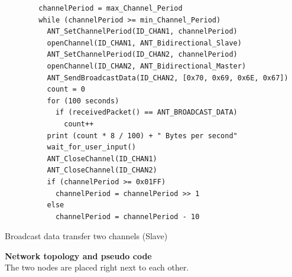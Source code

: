 \begin{description}
	\begin{code}[H]
		\begin{verbatim}
		channelPeriod = max_Channel_Period
		while (channelPeriod >= min_Channel_Period)
		  ANT_SetChannelPeriod(ID_CHAN1, channelPeriod)
		  openChannel(ID_CHAN1, ANT_Bidirectional_Slave)
		  ANT_SetChannelPeriod(ID_CHAN2, channelPeriod)
		  openChannel(ID_CHAN2, ANT_Bidirectional_Master)
		  ANT_SendBroadcastData(ID_CHAN2, [0x70, 0x69, 0x6E, 0x67])
		  count = 0
		  for (100 seconds) 
		    if (receivedPacket() == ANT_BROADCAST_DATA)
		      count++			
		  print (count * 8 / 100) + " Bytes per second"
		  wait_for_user_input()
		  ANT_CloseChannel(ID_CHAN1)
		  ANT_CloseChannel(ID_CHAN2)
		  if (channelPeriod >= 0x01FF)
		    channelPeriod = channelPeriod >> 1
		  else
		    channelPeriod = channelPeriod - 10
		\end{verbatim}
		\caption{Broadcast data transfer two channels (Slave)}\label{lst:mExp2}
	\end{code}
	
	\item{\textbf{Network topology and pseudo code}} \hfill \\ The two nodes are placed right next to each other.
	

\end{description}
